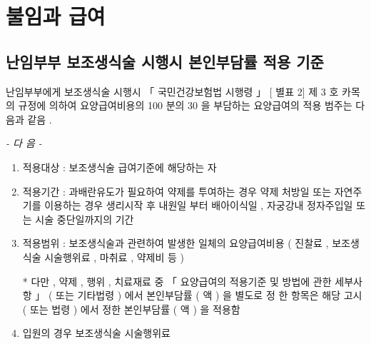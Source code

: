 \section{불임과 급여}

\subsection{난임부부 보조생식술 시행시  본인부담률 적용 기준} 
 
난임부부에게 보조생식술 시행시  「 국민건강보험법 시행령 」  [ 별표 2]  제 3 호 카목의 규정에 의하여 요양급여비용의  100 분의  30 을 부담하는 요양급여의 적용 범주는 다음과 같음 . \par
\emph{-  다 음  -}\par 
\begin{enumerate}[가.]\tightlist
\item 적용대상 :  보조생식술 급여기준에 해당하는 자 
\item 적용기간 :  과배란유도가 필요하여  약제를  투여하는 경우 약제  처방일 또는 자연주기를 이용하는 경우  생리시작 후 내원일 부터 배아이식일 ,  자궁강내  정자주입일 또는 시술 중단일까지의 기간 
\item 적용범위 :  보조생식술과 관련하여 발생한 일체의 요양급여비용 ( 진찰료 ,  보조생식술 시술행위료 ,  마취료 ,  약제비 등 ) \par
 *  다만 ,  약제 ,  행위 ,  치료재료 중  「 요양급여의 적용기준  및  방법에 관한 세부사항 」 ( 또는 기타법령 ) 에서 본인부담률 ( 액 ) 을 별도로  정 한 항목은 해당 고시 ( 또는 법령 ) 에서 정한  본인부담률 ( 액 ) 을 적용함 
\item 입원의 경우 보조생식술 시술행위료 
\end{enumerate} 


